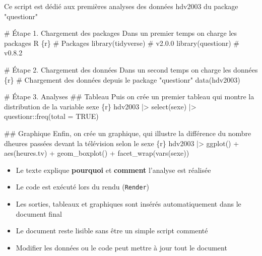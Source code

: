 \documentclass[
  french,
  10pt,
  a4paper,
]{article}
\newenvironment{Shaded}{}{}
\newcommand{\FunctionTok}[1]{\textcolor[rgb]{0.25,0.47,0.95}{#1}}
\newcommand{\NormalTok}[1]{\textcolor[rgb]{0.22,0.23,0.26}{#1}}
\providecommand{\tightlist}{%
  \setlength{\itemsep}{0pt}\setlength{\parskip}{0pt}}
\begin{document}
\begin{Shaded}
\begin{Highlighting}[]
\NormalTok{Ce script est dédié aux premières analyses des données hdv2003 du package "questionr"}

\FunctionTok{\#  Étape 1. Chargement des packages}
\NormalTok{Dans un premier temps on charge les packages R}
\NormalTok{  \textasciigrave{}\{r\}}
\NormalTok{  \# Packages}
\NormalTok{  library(tidyverse)  \# v2.0.0}
\NormalTok{  library(questionr)  \# v0.8.2}
\NormalTok{  \textasciigrave{}}

\FunctionTok{\#  Étape 2. Chargement des données}
\NormalTok{Dans un second temps on charge les données}
\NormalTok{  \textasciigrave{}\{r\}}
\NormalTok{  \# Chargement des données depuis le package "questionr"}
\NormalTok{  data(hdv2003)}
\NormalTok{  \textasciigrave{}}

\FunctionTok{\#  Étape 3. Analyses}
\FunctionTok{\#\# Tableau}
\NormalTok{Puis on crée un premier tableau qui montre la distribution de la variable sexe}
\NormalTok{  \textasciigrave{}\{r\}}
\NormalTok{  hdv2003 |\textgreater{} }
\NormalTok{    select(sexe) |\textgreater{} }
\NormalTok{    questionr::freq(total = TRUE)}
\NormalTok{  \textasciigrave{}}

\FunctionTok{\#\# Graphique}
\NormalTok{Enfin, on crée un graphique, qui illustre la différence du nombre d\textquotesingle{}heures passées devant la télévision selon le sexe}
\NormalTok{  \textasciigrave{}\{r\}}
\NormalTok{  hdv2003 |\textgreater{} }
\NormalTok{  ggplot() +}
\NormalTok{    aes(heures.tv) + }
\NormalTok{    geom\_boxplot() + }
\NormalTok{    facet\_wrap(vars(sexe))}
\NormalTok{  \textasciigrave{}}
\end{Highlighting}
\end{Shaded}

\begin{itemize}
\tightlist
\item
  Le texte explique \textbf{pourquoi} et \textbf{comment} l'analyse est
  réalisée\\
\item
  Le code est exécuté lors du rendu (\texttt{Render})\\
\item
  Les sorties, tableaux et graphiques sont insérés automatiquement dans
  le document final\\
\item
  Le document reste lisible sans être un simple script commenté\\
\item
  Modifier les données ou le code peut mettre à jour tout le document
\end{itemize}
\end{document}
